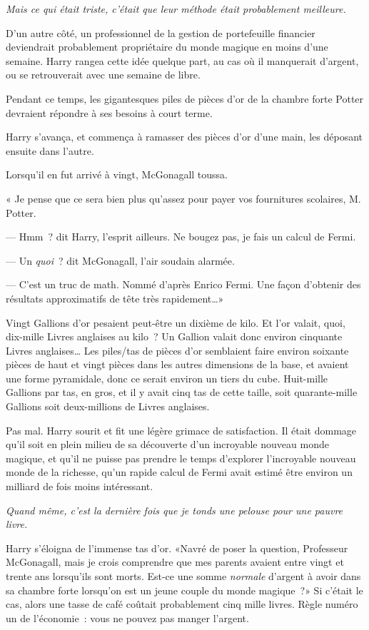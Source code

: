 \emph{Mais ce qui était triste, c'était que leur méthode était probablement meilleure.}

D'un autre côté, un professionnel de la gestion de portefeuille financier deviendrait probablement propriétaire du monde magique en moins d'une semaine. Harry rangea cette idée quelque part, au cas où il manquerait d'argent, ou se retrouverait avec une semaine de libre.

Pendant ce temps, les gigantesques piles de pièces d'or de la chambre forte Potter devraient répondre à ses besoins à court terme.

Harry s'avança, et commença à ramasser des pièces d'or d'une main, les déposant ensuite dans l'autre.

Lorsqu'il en fut arrivé à vingt, McGonagall toussa.

« Je pense que ce sera bien plus qu'assez pour payer vos fournitures scolaires, M. Potter.

--- Hmm~? dit Harry, l'esprit ailleurs. Ne bougez pas, je fais un calcul de Fermi.

--- Un \emph{quoi}~? dit McGonagall, l'air soudain alarmée.

--- C'est un truc de math. Nommé d'après Enrico Fermi. Une façon d'obtenir des résultats approximatifs de tête très rapidement…»

Vingt Gallions d'or pesaient peut-être un dixième de kilo. Et l'or valait, quoi, dix-mille Livres anglaises au kilo~? Un Gallion valait donc environ cinquante Livres anglaises… Les piles/tas de pièces d'or semblaient faire environ soixante pièces de haut et vingt pièces dans les autres dimensions de la base, et avaient une forme pyramidale, donc ce serait environ un tiers du cube. Huit-mille Gallions par tas, en gros, et il y avait cinq tas de cette taille, soit quarante-mille Gallions soit deux-millions de Livres anglaises.

Pas mal. Harry sourit et fit une légère grimace de satisfaction. Il était dommage qu'il soit en plein milieu de sa découverte d'un incroyable nouveau monde magique, et qu'il ne puisse pas prendre le temps d'explorer l'incroyable nouveau monde de la richesse, qu'un rapide calcul de Fermi avait estimé être environ un milliard de fois moins intéressant.

\emph{Quand même, c'est la dernière fois que je tonds une pelouse pour une pauvre livre.}

Harry s'éloigna de l'immense tas d'or. «Navré de poser la question, Professeur McGonagall, mais je crois comprendre que mes parents avaient entre vingt et trente ans lorsqu'ils sont morts. Est-ce une somme \emph{normale} d'argent à avoir dans sa chambre forte lorsqu'on est un jeune couple du monde magique~?» Si c'était le cas, alors une tasse de café coûtait probablement cinq mille livres. Règle numéro un de l'économie~: vous ne pouvez pas manger l'argent.

